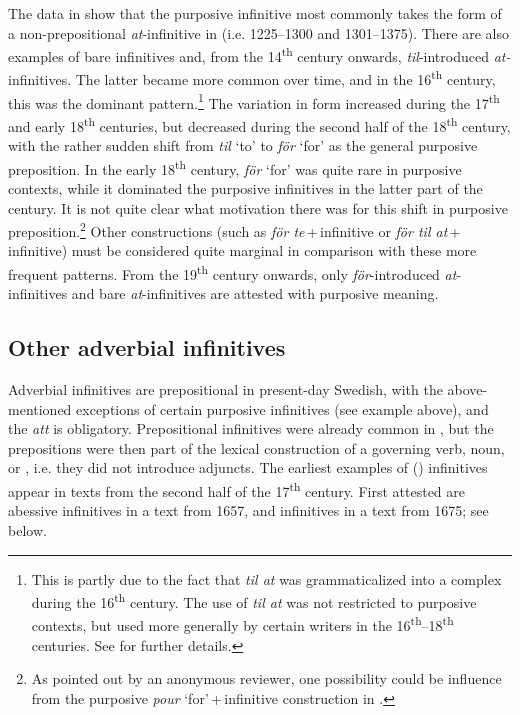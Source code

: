 \documentclass[output=paper]{langscibook}
\begin{document}
The data in  show that the purposive infinitive most commonly takes the form of a non-prepositional \textit{at}{}-infinitive in  (i.e. 1225–1300 and 1301–1375). There are also examples of bare infinitives and, from the 14\textsuperscript{th} century onwards, \textit{til}{}-introduced \textit{at-}infinitives. The latter became more common over time, and in the 16\textsuperscript{th} century, this was the dominant pattern.\footnote{This is partly due to the fact that \textit{til at} was grammaticalized into a complex  during the 16\textsuperscript{th} century. The use of \textit{til at} was not restricted to purposive contexts, but used more generally by certain writers in the 16\textsuperscript{th}–18\textsuperscript{th} centuries. See \textcites[]{Kalm2016Prepositioner}[203–221]{Kalm2016Satsekvivalenta} for further details.} The variation in form increased during the 17\textsuperscript{th} and early 18\textsuperscript{th} centuries, but decreased during the second half of the 18\textsuperscript{th} century, with the rather sudden shift from \textit{til} ‘to’ to \textit{för} ‘for’ as the general purposive preposition. In the early 18\textsuperscript{th} century, \textit{för} ‘for’ was quite rare in purposive contexts, while it dominated the purposive infinitives in the latter part of the century. It is not quite clear what motivation there was for this shift in purposive preposition.\footnote{As pointed out by an anonymous reviewer, one possibility could be influence from the purposive \textit{pour} ‘for’\,+\,infinitive construction in .}  Other constructions (such as \textit{för te}\,+\,infinitive or \textit{för til at}\,+\,infinitive) must be considered quite marginal in comparison with these more frequent patterns. From the 19\textsuperscript{th} century onwards, only \textit{för}{}-introduced \textit{at}{}-infinitives and bare \textit{at}{}-infinitives are attested with purposive meaning. 


\subsection{Other adverbial infinitives}\label{sec:kalm:4.2}

Adverbial infinitives are prepositional in present-day Swedish, with the above-mentioned exceptions of certain purposive infinitives (see example  above), and the  \textit{att} is obligatory. Prepositional infinitives were already common in , but the prepositions were then part of the lexical construction of a governing verb, noun, or , i.e. they did not introduce  adjuncts. The earliest examples of  () infinitives appear in texts from the second half of the 17\textsuperscript{th} century. First attested are abessive infinitives in a text from 1657, and  infinitives in a text from 1675; see  below. 
\end{document}
